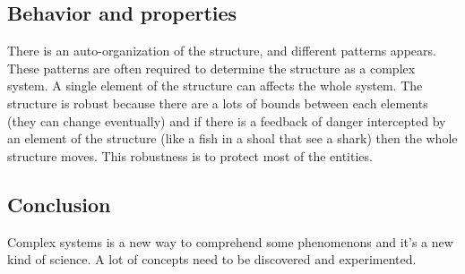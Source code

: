 \documentclass[twoside]{article}
\begin{document}
\subsection{Behavior and properties}

There is an auto-organization of the structure, and different patterns appears.
These patterns are often required to determine the structure as a complex system.
A single element of the structure can affects the whole system.
The structure is robust because there are a lots of bounds between each elements (they can change eventually) and 
if there is a feedback of danger intercepted by an element of the structure (like a fish in a shoal that see a shark) then the whole structure moves.
This robustness is to protect most of the entities.

\subsection{Conclusion}
Complex systems is a new way to comprehend some phenomenons and it's a new kind of science.
A lot of concepts need to be discovered and experimented.



\end{document}
